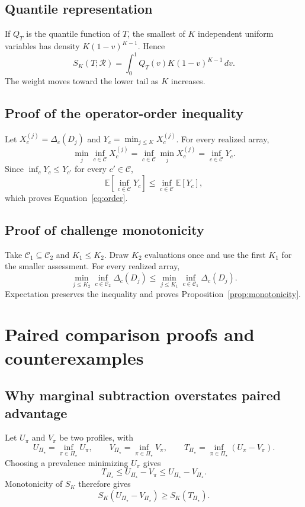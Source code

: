 \documentclass[11pt]{article}
\newcommand{\Regime}{\mathcal{R}}
\newcommand{\CSet}{\mathcal{C}}
\newcommand{\PSet}{\Pi_\star}
\newcommand{\E}{\mathbb{E}}
\theoremstyle{remark}
\begin{document}
\subsection{Quantile representation}

If $Q_T$ is the quantile function of $T$, the smallest of $K$ independent uniform variables has density $K(1-v)^{K-1}$. Hence
\begin{equation}
S_K(T;\Regime)
=
\int_0^1Q_T(v)K(1-v)^{K-1}\,dv.
\label{eq:quantile-weight}
\end{equation}
The weight moves toward the lower tail as $K$ increases.

\subsection{Proof of the operator-order inequality}

Let $X_c^{(j)}=\Delta_c(D_j)$ and $Y_c=\min_{j\leq K}X_c^{(j)}$. For every realized array,
\[
\min_j\inf_{c\in\CSet}X_c^{(j)}
=
\inf_{c\in\CSet}\min_jX_c^{(j)}
=
\inf_{c\in\CSet}Y_c.
\]
Since $\inf_c Y_c\leq Y_{c'}$ for every $c'\in\CSet$,
\[
\E\left[\inf_{c\in\CSet}Y_c\right]
\leq
\inf_{c\in\CSet}\E[Y_c],
\]
which proves Equation~\eqref{eq:order}.

\subsection{Proof of challenge monotonicity}

Take $\mathcal C_1\subseteq\mathcal C_2$ and $K_1\leq K_2$. Draw $K_2$ evaluations once and use the first $K_1$ for the smaller assessment. For every realized array,
\[
\min_{j\leq K_2}\inf_{c\in\mathcal C_2}\Delta_c(D_j)
\leq
\min_{j\leq K_1}\inf_{c\in\mathcal C_1}\Delta_c(D_j).
\]
Expectation preserves the inequality and proves Proposition~\ref{prop:monotonicity}.

\section{Paired comparison proofs and counterexamples}
\label{app:paired-proofs}

\subsection{Why marginal subtraction overstates paired advantage}

Let $U_\pi$ and $V_\pi$ be two profiles, with
\[
U_{\PSet}=\inf_{\pi\in\PSet}U_\pi,
\qquad
V_{\PSet}=\inf_{\pi\in\PSet}V_\pi,
\qquad
T_{\PSet}=\inf_{\pi\in\PSet}(U_\pi-V_\pi).
\]
Choosing a prevalence minimizing $U_\pi$ gives
\[
T_{\PSet}
\leq
U_{\PSet}-V_\pi
\leq
U_{\PSet}-V_{\PSet}.
\]
Monotonicity of $S_K$ therefore gives
\[
S_K(U_{\PSet}-V_{\PSet})
\geq
S_K(T_{\PSet}).
\]
\end{document}
